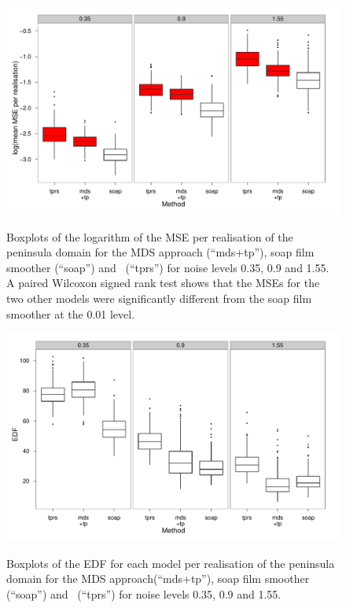 \begin{figure}
\centering
\includegraphics[width=\textwidth]{mds/figs/mds-wt2-boxplot.pdf} \\
\caption{Boxplots of the logarithm of the MSE per realisation of the peninsula domain for the MDS approach (``mds+tp''), soap film smoother (``soap'') and \tprs\ (``tprs'') for noise levels 0.35, 0.9 and 1.55. A paired Wilcoxon signed rank test shows that the MSEs for the two other models were significantly different from the soap film smoother at the 0.01 level.}
\label{mds-wt2-boxplot}
\end{figure}

\begin{figure}
\centering
\includegraphics[width=\textwidth]{mds/figs/mds-wt2-boxplot-edf.pdf} \\
\caption{Boxplots of the EDF for each model per realisation of the peninsula domain for the MDS approach(``mds+tp''), soap film smoother (``soap'') and \tprs\ (``tprs'') for noise levels 0.35, 0.9 and 1.55.}
\label{mds-wt2-boxplot-edf}
\end{figure}


